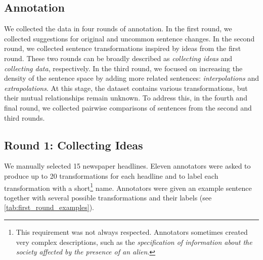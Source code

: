 \subsection{Annotation}
We collected the data in four rounds of annotation. In the first round, we collected suggestions for original and uncommon sentence changes. In the second round, we collected sentence transformations inspired by ideas from the first round. These two rounds can be broadly described as \textit{collecting ideas} and \textit{collecting data}, respectively. In the third round, we focused on increasing the density of the sentence space by adding more related sentences: \textit{interpolations} and \textit{extrapolations}. At this stage, the dataset contains various transformations, but their mutual relationships remain unknown. To address this, in the fourth and final round, we collected pairwise comparisons of sentences from the second and third rounds.

\subsection{Round 1: Collecting Ideas}
We manually selected 15 newspaper headlines. Eleven annotators were asked to produce up to 20 transformations for each headline and to label each transformation with a short\footnote{This requirement was not always respected. Annotators sometimes created very complex descriptions, such as the \textit{specification of information about the society affected by the presence of an alien}.} name. Annotators were given an example sentence together with several possible transformations and their labels (see \cref{tab:first_round_examples}).

